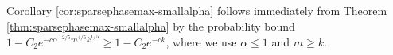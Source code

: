 \documentclass[12pt]{article}
\newcommand{\1}{\mathbf{1}}
\begin{document}
Corollary \ref{cor:sparsephasemax-smallalpha} follows immediately from Theorem \ref{thm:sparsephasemax-smallalpha} by the probability bound $1 - C_2 e^{-c \alpha^{-2/5} m^{4/5} k^{1/5} }  \geq 1 - C_2 e^{-c k}$, where we use  $\alpha \leq 1$ and $m \geq k$.



%
%
%
%
%
%
%
\end{document}
